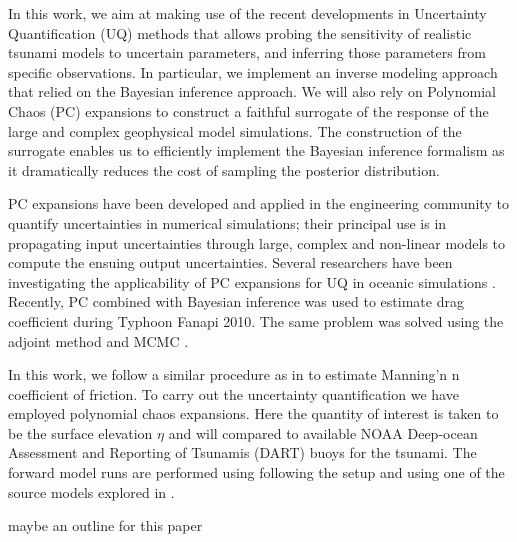 In this work, we aim at making use of the recent developments in Uncertainty Quantification 
(UQ) methods that allows probing the sensitivity of realistic tsunami models 
to uncertain parameters, and inferring those parameters from specific observations. 
In particular, we implement an inverse modeling approach that relied on the Bayesian inference approach.  
We will also rely on Polynomial Chaos (PC) expansions to construct a 
faithful surrogate of the response of the large and complex geophysical 
model simulations.  The construction of the surrogate enables us to efficiently 
implement the Bayesian inference formalism as it dramatically reduces the cost of 
sampling the posterior distribution. 

PC expansions have been developed and applied in the engineering community to quantify uncertainties
in numerical simulations; their principal use is in propagating input
uncertainties through large, complex and non-linear models to compute the
ensuing output uncertainties. Several researchers have been 
investigating the applicability of PC expansions for UQ in oceanic simulations
\citep{thacker2012,ashwanth2010,Alexanderian2012}. Recently,
PC combined with Bayesian inference was used to estimate drag coefficient
during Typhoon Fanapi 2010. The same problem was solved using
the adjoint method and MCMC \cite{sraj:2013a,sraj:2013b}.

In this work, we follow a similar procedure as in \cite{sraj:2013a,sraj:2013b}
to estimate Manning'n n coefficient of friction. 
To carry out the uncertainty quantification we have employed polynomial chaos expansions.  Here the quantity of interest is taken to be the surface elevation $\eta$ and will compared to available NOAA Deep-ocean Assessment and Reporting of Tsunamis (DART) buoys for the \tohoku tsunami.  The forward model runs are performed using \geoclaw following the setup and using one of the source models explored in \cite{MacInnes:2013cr}.

\alert{maybe an outline for this paper}
